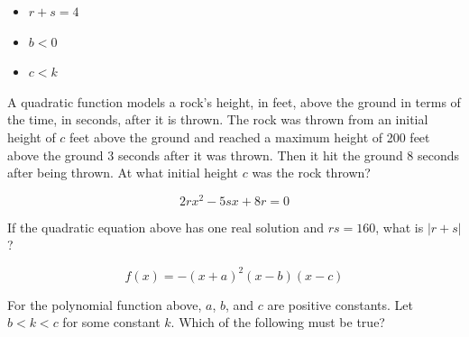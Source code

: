 \begin{itemize}
\item[I.] $r+s=4$
\item[II.] $b<0$
\item[III.] $c<k$
\end{itemize}

\vspace{0.75em}


\vspace{4em}

\vspace{2em}

\noindent\markforreview
\vspace{1em}

\vspace{1em}

A quadratic function models a rock's height, in feet, above the ground in terms of the time, in seconds, after it is thrown. 
The rock was thrown from an initial height of $c$ feet above the ground and reached a maximum height of 200 feet above the ground 3 seconds after it was thrown. 
Then it hit the ground 8 seconds after being thrown. 
At what initial height $c$ was the rock thrown?


\newpage

\newpage

\noindent\markforreview
\vspace{1em}

\vspace{1em}

\[
2rx^{2}-5sx+8r=0
\]

If the quadratic equation above has one real solution and $rs=160$, what is $\lvert r+s\rvert$?



\vspace{2em}

\vspace{2em}

\noindent\markforreview
\vspace{1em}

\vspace{1em}

\[
f(x)=-(x+a)^{2}(x-b)(x-c)
\]

For the polynomial function above, $a$, $b$, and $c$ are positive constants.  
Let $b<k<c$ for some constant $k$. Which of the following must be true?

